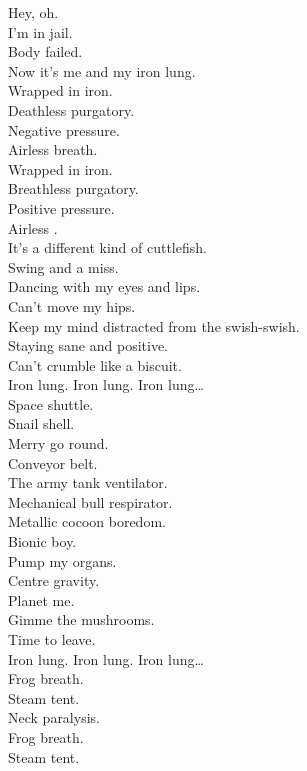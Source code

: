 

Hey, oh. \\
I'm in jail. \\
Body failed. \\
Now it's me and my iron lung. \\
Wrapped in iron. \\
Deathless purgatory. \\
Negative pressure. \\
Airless breath. \\
Wrapped in iron. \\
Breathless purgatory. \\
Positive pressure. \\
Airless . \\

It's a different kind of cuttlefish. \\
Swing and a miss. \\
Dancing with my eyes and lips. \\
Can't move my hips. \\
Keep my mind distracted from the swish-swish. \\
Staying sane and positive. \\
Can't crumble like a biscuit. \\

Iron lung. Iron lung. Iron lung… \\

Space shuttle. \\
Snail shell. \\
Merry go round. \\
Conveyor belt. \\
The army tank ventilator. \\
Mechanical bull respirator. \\
Metallic cocoon boredom. \\
Bionic boy. \\
Pump my organs. \\
Centre gravity. \\
Planet me. \\
Gimme the mushrooms. \\
Time to leave. \\

Iron lung. Iron lung. Iron lung… \\

Frog breath. \\
Steam tent. \\
Neck paralysis. \\
Frog breath. \\
Steam tent. \\

